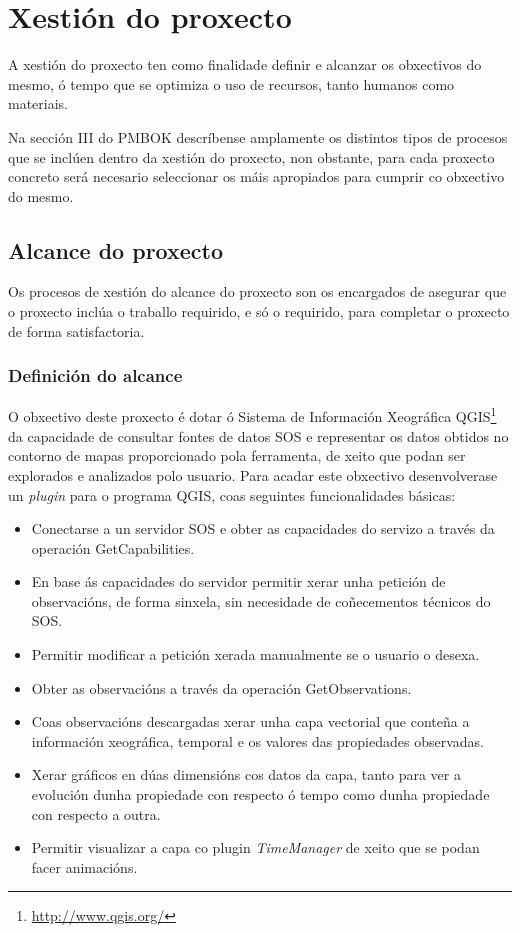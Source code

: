\chapter{Xestión do proxecto}
A xestión do proxecto ten como finalidade definir e alcanzar os obxectivos do mesmo, ó tempo que se optimiza o uso de recursos, tanto humanos como materiais.

Na sección III do PMBOK\cite{PMBOK} descríbense amplamente os distintos tipos de procesos que se inclúen dentro da xestión do proxecto, non obstante, para cada proxecto concreto será necesario seleccionar os máis apropiados para cumprir co obxectivo do mesmo.

\section{Alcance do proxecto}
Os procesos de xestión do alcance do proxecto son os encargados de asegurar que o proxecto inclúa o traballo requirido, e só o requirido, para completar o proxecto de forma satisfactoria.

\subsection{Definición do alcance}\label{subsec:DefAlcance}
O obxectivo deste proxecto é dotar ó Sistema de Información Xeográfica QGIS\footnote{\url{http://www.qgis.org/}} da capacidade de consultar fontes de datos SOS e representar os datos obtidos no contorno de mapas proporcionado pola ferramenta, de xeito que podan ser explorados e analizados polo usuario. Para acadar este obxectivo desenvolverase un \emph{plugin} para o programa QGIS, coas seguintes funcionalidades básicas:

\begin{itemize}
\item Conectarse a un servidor SOS e obter as capacidades do servizo a través da operación GetCapabilities.
\item En base ás capacidades do servidor permitir xerar unha petición de observacións, de forma sinxela, sin necesidade de coñecementos técnicos do SOS.
\item Permitir modificar a petición xerada manualmente se o usuario o desexa.
\item Obter as observacións a través da operación GetObservations.
\item Coas observacións descargadas xerar unha capa vectorial que conteña a información xeográfica, temporal e os valores das propiedades observadas.
\item Xerar gráficos en dúas dimensións cos datos da capa, tanto para ver a evolución dunha propiedade con respecto ó tempo como dunha propiedade con respecto a outra.
\item Permitir visualizar a capa co plugin \emph{TimeManager} de xeito que se podan facer animacións.
\end{itemize}

